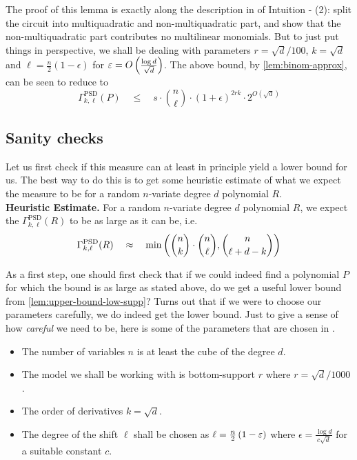 The proof of this lemma is exactly along the description in of Intuition - (2): split the circuit into multiquadratic and non-multiquadratic part, and show that the non-multiquadratic part contributes no multilinear monomials. 
But to just put things in perspective, we shall be dealing with parameters $r = \sqrt{d}/100$, $k = \sqrt{d}$ and $\ell = \frac{n}{2}(1 - \epsilon)$ for $\varepsilon = O\left(\frac{\log d}{\sqrt{d}}\right)$. 
The above bound, by \autoref{lem:binom-approx}, can be seen to reduce to
\[
\Gamma^{\mathrm{PSD}}_{k,\ell}(P) \quad \leq \quad s \cdot \binom{n}{\ell} \cdot (1+\epsilon)^{2rk} \cdot 2^{O(\sqrt{d})}
\]


\subsection*{Sanity checks}

Let us first check if this measure can at least in principle yield a lower bound for us. 
The best way to do this is to get some heuristic estimate of what we expect the measure to be for a random $n$-variate degree $d$ polynomial $R$. \\

{\bf Heuristic Estimate. } For a random $n$-variate degree $d$ polynomial $R$, we expect the $\Gamma^{\mathrm{PSD}}_{k,\ell}(R)$ to be as large as it can be, i.e.
\[
\Gamma^{\mathrm{PSD}}_{k,\ell}(R) \quad \approx \quad \min\left(\binom{n}{k}\cdot \binom{n}{\ell}, \binom{n}{\ell + d-k}\right)
\]

As a first step, one should first check that if we could indeed find a polynomial $P$ for which the bound is as large as stated above, do we get a useful lower bound from \autoref{lem:upper-bound-low-supp}? Turns out that if we were to choose our parameters carefully, we do indeed get the lower bound. 
Just to give a sense of how \emph{careful} we need to be, here is some of the parameters that are chosen in \cite{KLSS,KS14}. 

\begin{itemize}
\item The number of variables $n$ is at least the cube of the degree $d$. 
\item The model we shall be working with is bottom-support $r$ where $r = \sqrt{d}/1000$. 
\item The order of derivatives $k = \sqrt{d}$. 
\item The degree of the shift $\ell$ shall be chosen as $\ell = \frac{n}{2}\left(1 - \varepsilon\right)$ where $\epsilon = \frac{\log d}{c\sqrt{d}}$ for a suitable constant $c$. 
\end{itemize}

